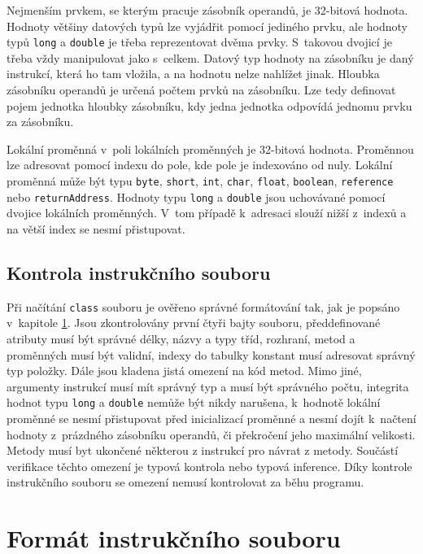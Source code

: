 Nejmenším prvkem, se kterým pracuje zásobník operandů, je 32-bitová hodnota. Hodnoty většiny datových typů lze vyjádřit pomocí jediného prvku, ale hodnoty typů \texttt{long} a \texttt{double} je třeba reprezentovat dvěma prvky. S~takovou dvojicí je třeba vždy manipulovat jako s~celkem. Datový typ hodnoty na zásobníku je daný instrukcí, která ho tam vložila, a na hodnotu nelze nahlížet jinak. Hloubka zásobníku operandů je určená počtem prvků na zásobníku. Lze tedy definovat pojem jednotka hloubky zásobníku, kdy jedna jednotka odpovídá jednomu prvku za zásobníku.

Lokální proměnná v~poli lokálních proměnných je 32-bitová hodnota. Proměnnou lze adresovat pomocí indexu do pole, kde pole je indexováno od nuly. Lokální proměnná může být typu \texttt{byte}, \texttt{short}, \texttt{int}, \texttt{char}, \texttt{float}, \texttt{boolean}, \texttt{reference} nebo \texttt{returnAddress}. Hodnoty typu \texttt{long} a \texttt{double} jsou uchovávané pomocí dvojice lokálních proměnných. V~tom případě k~adresaci slouží nižší z~indexů a na větší index se nesmí přistupovat. 


\subsection{Kontrola instrukčního souboru}

Při načítání \texttt{class} souboru je ověřeno správné formátování tak, jak je popsáno v~kapitole \ref{Bytecode:Format}. Jsou zkontrolovány první čtyři bajty souboru, předdefinované atributy musí být správné délky, názvy a typy tříd, rozhraní, metod a proměnných musí být validní, indexy do tabulky konstant musí adresovat správný typ položky. Dále jsou kladena jistá omezení na kód metod. Mimo jiné, argumenty instrukcí musí mít správný typ a musí být správného počtu, integrita hodnot typu \texttt{long} a \texttt{double} nemůže být nikdy narušena, k~hodnotě lokální proměnné se nesmí přistupovat před inicializací proměnné a nesmí dojít k~načtení hodnoty z~prázdného zásobníku operandů, či překročení jeho maximální velikosti. Metody musí byt ukončené některou z instrukcí pro návrat z metody. Součástí verifikace těchto omezení je typová kontrola nebo typová inference. Díky kontrole instrukčního souboru se omezení nemusí kontrolovat za běhu programu.


\section{Formát instrukčního souboru}\label{Bytecode:Format}

